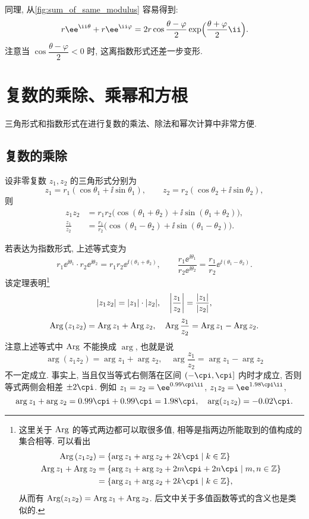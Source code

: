 同理, 从\ref{fig:sum_of_same_modulus} 容易得到:
\begin{equation}
  \label{eq:sum-of-same-modulus}
   r\ee^{\ii\theta}+r\ee^{\ii\varphi}
  =2r\cos\frac{\theta-\varphi}2\exp\Bigl(\frac{\theta+\varphi}2\ii\Bigr).
\end{equation}
注意当 $\cos\dfrac{\theta-\varphi}2<0$ 时, 这离指数形式还差一步变形.



\section{复数的乘除、乘幂和方根}

三角形式和指数形式在进行复数的乘法、除法和幂次计算中非常方便.

\subsection{复数的乘除}

\begin{theorem}
  \label{thm:multiply}
  设非零复数 $z_1,z_2$ 的三角形式分别为
  \[
    z_1=r_1(\cos\theta_1+\ii\sin\theta_1),\qquad
    z_2=r_2(\cos\theta_2+\ii\sin\theta_2),
  \]
  则
  \begin{align*}
     z_1z_2&
    =r_1r_2\bigl(\cos(\theta_1+\theta_2)+\ii\sin(\theta_1+\theta_2)\bigr),\\
     \frac{z_1}{z_2}&
    =\frac{r_1}{r_2}\bigl(\cos(\theta_1-\theta_2)+\ii\sin(\theta_1-\theta_2)\bigr).
  \end{align*}
\end{theorem}

若表达为指数形式, 上述等式变为
  \[
    r_1\ee^{\ii\theta_1}\cdot r_2\ee^{\ii\theta_2}=r_1r_2\ee^{\ii(\theta_1+\theta_2)},\qquad
    \frac{r_1\ee^{\ii\theta_1}}{r_2\ee^{\ii\theta_2}}=\frac{r_1}{r_2}\ee^{\ii(\theta_1-\theta_2)}.
  \]
该定理表明\footnote{%
  这里关于 $\operatorname{Arg}$ 的等式两边都可以取很多值, 相等是指两边所能取到的值构成的集合相等.
  可以看出
  \begin{align*}
    \Arg{(z_1z_2)}&
   =\{\arg z_1+\arg z_2+2k\cpi\mid k\in\BZ\}\\
   \Arg z_1 +\Arg z_2&
   =\{\arg z_1+\arg z_2+2m\cpi+2n\cpi\mid m,n\in\BZ\}\\&
   =\{\arg z_1+\arg z_2+2k\cpi\mid k\in\BZ\},
  \end{align*}
  从而有 $\operatorname{Arg}(z_1z_2)=\operatorname{Arg} z_1+\operatorname{Arg} z_2$.
  后文中关于多值函数等式的含义也是类似的.
}
\[
  |z_1z_2|=|z_1|\cdot|z_2|,\quad
  \left|\frac{z_1}{z_2}\right|=\frac{|z_1|}{|z_2|},
\]
\begin{equation}
  \label{eq:Arg-multiply-divide-equality}
  \operatorname{Arg}{(z_1z_2)}=\operatorname{Arg} z_1+\operatorname{Arg} z_2,\quad
  \operatorname{Arg}{\frac{z_1}{z_2}}=\operatorname{Arg} z_1-\operatorname{Arg} z_2.
\end{equation}
注意上述等式中 $\operatorname{Arg}$ 不能换成 $\arg$, 也就是说
\[
  \arg{(z_1z_2)}=\arg z_1+\arg z_2,\quad
  \arg{\frac{z_1}{z_2}}=\arg z_1-\arg z_2
\]
\alert{不一定成立}.
事实上, 当且仅当等式右侧落在区间 $(-\cpi,\cpi]$ 内时才成立, 否则等式两侧会相差 $\pm2\cpi$.
例如 $z_1=z_2=\ee^{0.99\cpi \ii}$, $z_1z_2=\ee^{1.98\cpi \ii}$,
\[
  \arg z_1+\arg z_2=0.99\cpi+0.99\cpi=1.98\cpi,\quad
  \arg(z_1z_2)=-0.02\cpi.
\]

